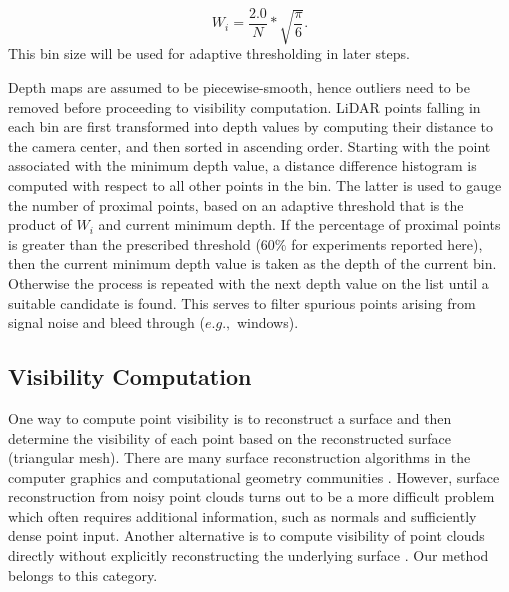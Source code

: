 \begin{equation}
 W_i = \frac{2.0}{N}*\sqrt{\frac{\pi}{6}}.
\label{eq:C6:binwidth}
\end{equation} 
This bin size will be used for adaptive thresholding in later steps. 

Depth maps are assumed to be piecewise-smooth, hence outliers need to be removed before proceeding to visibility computation. LiDAR points falling in each bin are first transformed into depth values by computing their distance to the camera center, and then sorted in ascending order. Starting with the point associated with the minimum depth value, a distance difference histogram is computed with respect to all other points in the bin.  The latter is used to gauge the number of proximal points, based on an adaptive threshold that is the product of $W_i$ and current minimum depth. If the percentage of proximal points is greater than the prescribed threshold ($60\%$ for experiments reported here), then the current minimum depth value is taken as the depth of the current bin.  Otherwise the process is repeated with the next depth value on the list until a suitable candidate is found. This serves to filter spurious points arising from signal noise and bleed through ($e.g.,$ windows). 

\subsection{Visibility Computation}

One way to compute point visibility is to reconstruct a surface and then determine the visibility of each point based on the reconstructed surface (triangular mesh). There are many surface reconstruction algorithms in the computer graphics and computational geometry communities \cite{Hoppe92, Curless96, Bernardini99, Kazhdan06, Fleishman05, Carr01, Amenta04, Dey06}. However, surface reconstruction from noisy point clouds turns out to be a more difficult problem which often requires additional information, such as normals and sufficiently dense point input. Another alternative is to compute visibility of point clouds directly without explicitly reconstructing the underlying surface \cite{Katz07, MTSM10}. Our method belongs to this category. 

